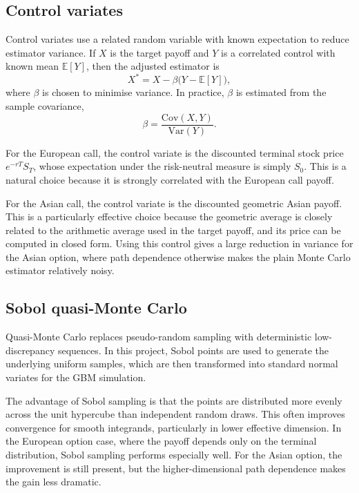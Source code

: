 \documentclass[11pt]{article}
\begin{document}
\subsection{Control variates}

Control variates use a related random variable with known expectation to reduce estimator variance. If $X$ is the target payoff and $Y$ is a correlated control with known mean $\mathbb{E}[Y]$, then the adjusted estimator is
\begin{equation}
X^* = X - \beta\bigl(Y - \mathbb{E}[Y]\bigr),
\end{equation}
where $\beta$ is chosen to minimise variance. In practice, $\beta$ is estimated from the sample covariance,
\begin{equation}
\beta = \frac{\mathrm{Cov}(X,Y)}{\mathrm{Var}(Y)}.
\end{equation}

For the European call, the control variate is the discounted terminal stock price $e^{-rT}S_T$, whose expectation under the risk-neutral measure is simply $S_0$. This is a natural choice because it is strongly correlated with the European call payoff.

For the Asian call, the control variate is the discounted geometric Asian payoff. This is a particularly effective choice because the geometric average is closely related to the arithmetic average used in the target payoff, and its price can be computed in closed form. Using this control gives a large reduction in variance for the Asian option, where path dependence otherwise makes the plain Monte Carlo estimator relatively noisy.

\subsection{Sobol quasi-Monte Carlo}

Quasi-Monte Carlo replaces pseudo-random sampling with deterministic low-discrepancy sequences. In this project, Sobol points are used to generate the underlying uniform samples, which are then transformed into standard normal variates for the GBM simulation.

The advantage of Sobol sampling is that the points are distributed more evenly across the unit hypercube than independent random draws. This often improves convergence for smooth integrands, particularly in lower effective dimension. In the European option case, where the payoff depends only on the terminal distribution, Sobol sampling performs especially well. For the Asian option, the improvement is still present, but the higher-dimensional path dependence makes the gain less dramatic.
\end{document}
